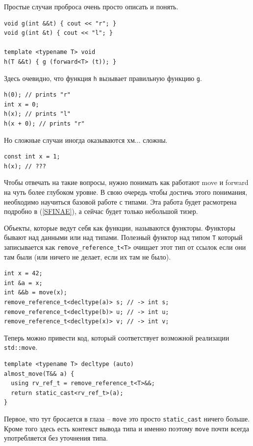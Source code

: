 \documentclass[a4paper,12pt,oneside]{article}
\begin{document}
Простые случаи проброса очень просто описать и понять.

\begin{lstlisting}
void g(int &&t) { cout << "r"; }
void g(int &t) { cout << "l"; }

template <typename T> void 
h(T &&t) { g (forward<T> (t)); }
\end{lstlisting}

Здесь очевидно, что функция \lstinline!h! вызывает правильную функцию \lstinline!g!.

\begin{lstlisting}
h(0); // prints "r"
int x = 0; 
h(x); // prints "l"
h(x + 0); // prints "r"
\end{lstlisting}

Но сложные случаи иногда оказываются хм... сложны.

\begin{lstlisting}
const int x = 1;
h(x); // ???
\end{lstlisting}

Чтобы отвечать на такие вопросы, нужно понимать как работают move и forward на чуть более глубоком уровне. В свою очередь чтобы достичь этого понимания, необходимо научиться базовой работе с типами. Эта работа будет расмотрена подробно в (\ref{SFINAE}), а сейчас будет только небольшой тизер.

Объекты, которые ведут себя как функции, называются функторы. Функторы бывают над данными или над типами. Полезный функтор над типом \lstinline!T! который записывается как \lstinline!remove_reference_t<T>! очищает этот тип от ссылок если они там были (или ничего не делает, если их там не было).

\begin{lstlisting}
int x = 42;
int &a = x;
int &&b = move(x);
remove_reference_t<decltype(a)> s; // -> int s;
remove_reference_t<decltype(b)> u; // -> int u;
remove_reference_t<decltype(x)> v; // -> int v;
\end{lstlisting}

Теперь можно привести код, который соответствует возможной реализации \lstinline!std::move!.

\begin{lstlisting}
template <typename T> decltype (auto)
almost_move(T&& a) {
  using rv_ref_t = remove_reference_t<T>&&;
  return static_cast<rv_ref_t>(a);
} 
\end{lstlisting}

Первое, что тут бросается в глаза -- \lstinline!move! это просто \lstinline!static_cast! ничего больше. Кроме того здесь есть контекст вывода типа и именно поэтому \lstinline!move! почти всегда употребляется без уточнения типа.
\end{document}
